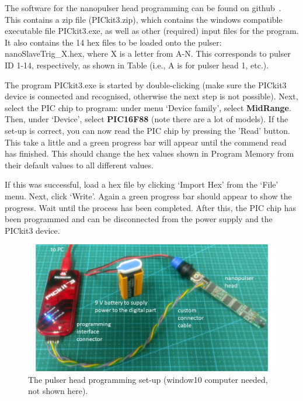 The software for the nanopulser head programming can be found on github~\cite{GITHUB_PIC}. This contains a zip file (PICkit3.zip), which contains the windows compatible executable file PICkit3.exe, as well as other (required) input files for the program. It also contains the 14 hex files to be loaded onto the pulser: nanoSlaveTrig\_X.hex, where X is a letter from A-N. This corresponds to pulser ID 1-14, respectively, as shown in Table%
 (i.e., A is for pulser head 1, etc.).

The program PICkit3.exe is started by double-clicking (make sure the PICkit3 device is connected and recognised, otherwise the next step is not possible). Next, select the PIC chip to program: under menu `Device family', select {\bf MidRange}. Then, under `Device', select {\bf PIC16F88} (note there are a lot of models). If the set-up is correct, you can now read the PIC chip by pressing the 'Read' button. This take a little and a green progress bar will appear until the commend read has finished. This should change the hex values shown in Program Memory from their default values to all different values. 

If this was successful, load a hex file by clicking `Import Hex' from the `File' menu. Next, click `Write'. Again a green progress bar should appear to show the progress. Wait until the process has been completed. After this, the PIC chip has been programmed and can be disconnected from the power supply and the PICkit3 device.

\begin{figure}
\begin{center}	
  \includegraphics[width=1.0\linewidth]{figures/pulserhead_programming.jpg}
  \caption{The pulser head programming set-up (window10 computer needed, not shown here).}
  \label{figure:pulserhead_programming}
\end{center}
\end{figure}

